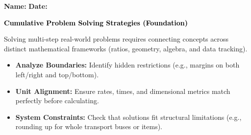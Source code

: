 \documentclass[12pt, letterpaper, fleqn]{article}
\begin{document}
\textbf{Name:} \underline{\hspace{5cm}}
\hfill
\textbf{Date:} \underline{\hspace{3cm}}\\

\begin{tcolorbox}[colback=black!10]
    \large\textcolor{black}{\textbf{Cumulative Problem Solving Strategies (Foundation)}}
\end{tcolorbox}

\vspace{1mm}

\noindent
Solving multi-step real-world problems requires connecting concepts across distinct mathematical frameworks (ratios, geometry, algebra, and data tracking).
\begin{itemize}[noitemsep, leftmargin=0.5cm]
    \item \textbf{Analyze Boundaries:} Identify hidden restrictions (e.g., margins on both left/right and top/bottom).
    \item \textbf{Unit Alignment:} Ensure rates, times, and dimensional metrics match perfectly before calculating.
    \item \textbf{System Constraints:} Check that solutions fit structural limitations (e.g., rounding up for whole transport buses or items).
\end{itemize}

\vspace{2mm}
\end{document}
